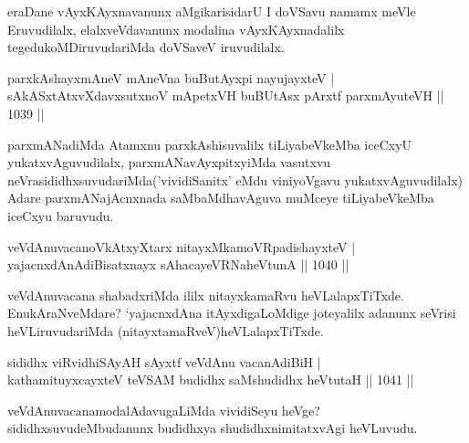 \begin{artha}
eraDane vAyxKAyxnavanunx aMgikarisidarU I doVSavu namamx meVle Eruvudilalx, 
elalxveVdavanunx modalina vAyxKAyxnadalilx tegedukoMDiruvudariMda doVSaveV iruvudilalx.
\end{artha}


\begin{shl}
parxkAshayxmAneV mAneVna buButAyx\s pi nayujayxteV |\\
sAkASxtAtxvXdavxsutxnoV mApetxVH buBUtAsx pArxtf parxmAyuteVH || 1039 ||
\end{shl}

\begin{artha}
parxmANadiMda Atamxnu parxkAshisuvalilx tiLiyabeVkeMba iceCxyU yukatxvAguvudilalx, parxmANavAyxpitxyiMda vasutxvu neVrasididhxsuvudariMda('vividiSanitx' eMdu viniyoVgavu yukatxvAguvudilalx) Adare parxmANajAcnxnada saMbaMdhavAguva muMceye tiLiyabeVkeMba iceCxyu baruvudu.
\end{artha}


\begin{shl}
veVdAnuvacanoVkAtxyX\s tarx \footnotemark[1]nitayxMkamoVRpadishayxteV |\\
yajacnxdAnAdiBisatxnayx sAhacayeVRNaheVtunA || 1040 ||
\end{shl}

\begin{artha}
veVdAnuvacana shabadxriMda ililx nitayxkamaRvu heVLalapxTiTxde. EnukAraNveMdare? `yajacnxdAna itAyxdigaLoMdige joteyalilx adanunx seVrisi heVLiruvudariMda (nitayxtamaRveV)heVLalapxTiTxde.
\end{artha}

\begin{shl}
sididhx viRvidhiSAyAH sAyxtf veVdAnu vacanAdiBiH |\\
kathamituyxcayxteV teVSAM budidhx saMshudidhx heVtutaH || 1041 ||
\end{shl}

\begin{artha}
veVdAnuvacanamodalAdavugaLiMda vividiSeyu heVge? sididhxsuvudeMbudanunx budidhxya shudidhxnimitatxvAgi heVLuvudu.
\end{artha}

